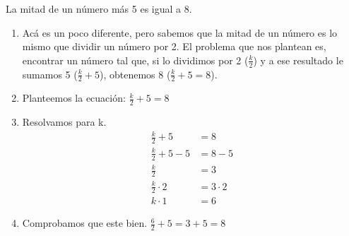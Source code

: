 \documentclass{article}
\begin{document}
\begin{ejemplo}
La mitad de un número más 5 es igual a 8.

\begin{enumerate}
	\item Acá es un poco diferente, pero sabemos que la mitad de un número es lo mismo que dividir un número por 2. El problema que nos plantean es, encontrar un número tal que, si lo dividimos por 2 ($\frac{k}{2}$) y a ese resultado le sumamos 5 ($\frac{k}{2}+5$), obtenemos 8 ($\frac{k}{2}+5=8$).
	\item Planteemos la ecuación: $\frac{k}{2}+5=8$
	\item Resolvamos para k.
	\begin{align}
	\frac{k}{2}+5&=8\nonumber\\
	\frac{k}{2}+5-5&=8-5\nonumber\\
	\frac{k}{2}&=3\nonumber\\
	\frac{k}{2}\cdot2&=3\cdot2\nonumber\\
	k\cdot1&=6\nonumber
	\end{align}
	\item Comprobamos que este bien. $\frac{6}{2}+5=3+5=8$
\end{enumerate}

\end{ejemplo}
\end{document}

